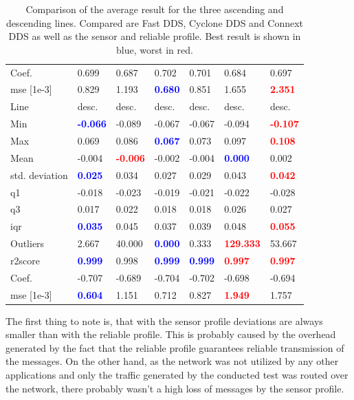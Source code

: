 \begin{table}[htbp]
\begin{tabular}{|l|ll|ll|ll|}
Coef. & 0.699 & 0.687 & 0.702 & 0.701 & 0.684 & 0.697 \\
\gls{mse} [1e-3] & 0.829 & 1.193 & \textcolor{blue}{\textbf{0.680}} & 0.851 & 1.655 & \textcolor{red}{\textbf{2.351}} \\
\midrule
Line & desc. & desc. & desc. & desc. & desc. & desc. \\
Min & \textcolor{blue}{\textbf{-0.066}} & -0.089 & -0.067 & -0.067 & -0.094 & \textcolor{red}{\textbf{-0.107}} \\
Max & 0.069 & 0.086 & \textcolor{blue}{\textbf{0.067}} & 0.073 & 0.097 & \textcolor{red}{\textbf{0.108}} \\
Mean & -0.004 & \textcolor{red}{\textbf{-0.006}} & -0.002 & -0.004 & \textcolor{blue}{\textbf{0.000}} & 0.002 \\
std. deviation & \textcolor{blue}{\textbf{0.025}} & 0.034 & 0.027 & 0.029 & 0.043 & \textcolor{red}{\textbf{0.042}} \\
\gls{q1} & -0.018 & -0.023 & -0.019 & -0.021 & -0.022 & -0.028 \\
\gls{q3} & 0.017 & 0.022 & 0.018 & 0.018 & 0.026 & 0.027 \\
\gls{iqr} & \textcolor{blue}{\textbf{0.035}} & 0.045 & 0.037 & 0.039 & 0.048 & \textcolor{red}{\textbf{0.055}} \\
Outliers & 2.667 & 40.000 & \textcolor{blue}{\textbf{0.000}} & 0.333 & \textcolor{red}{\textbf{129.333}} & 53.667 \\
\gls{r2}score & \textcolor{blue}{\textbf{0.999}} & 0.998 & \textcolor{blue}{\textbf{0.999}} & \textcolor{blue}{\textbf{0.999}} & \textcolor{red}{\textbf{0.997}} & \textcolor{red}{\textbf{0.997}} \\
Coef. & -0.707 & -0.689 & -0.704 & -0.702 & -0.698 & -0.694 \\
\gls{mse} [1e-3] & \textcolor{blue}{\textbf{0.604}} & 1.151 & 0.712 & 0.827 & \textcolor{red}{\textbf{1.949}} & 1.757 \\
\bottomrule
\end{tabular}
    \centering
    \caption{Comparison of the average result for the three ascending and descending lines. Compared are Fast DDS, Cyclone DDS and Connext DDS as well as the sensor and reliable profile. Best result is shown in blue, worst in red.}
    \label{c6_tab_result_overview}
\end{table}
The first thing to note is, that with the sensor profile deviations are always smaller than with the reliable profile. This is probably caused by the overhead generated by the fact that the reliable profile guarantees reliable transmission of the messages. On the other hand, as the network was not utilized by any other applications and only the traffic generated by the conducted test was routed over the network, there probably wasn't a high loss of messages by the sensor profile.\newline
